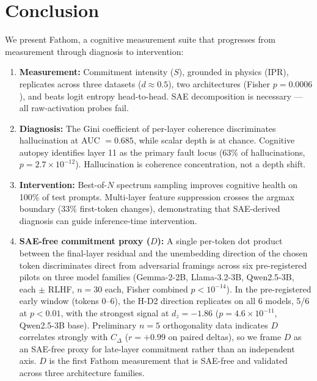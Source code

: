 \documentclass{article}
\begin{document}
\section{Conclusion}

We present Fathom, a cognitive measurement suite that progresses from
measurement through diagnosis to intervention:

\begin{enumerate}
\item \textbf{Measurement:} Commitment intensity ($S$), grounded in
  physics (IPR), replicates across three datasets ($d \approx 0.5$),
  two architectures (Fisher $p = 0.0006$), and beats logit entropy
  head-to-head. SAE decomposition is necessary --- all raw-activation
  probes fail.
\item \textbf{Diagnosis:} The Gini coefficient of per-layer coherence
  discriminates hallucination at AUC $= 0.685$, while scalar depth is
  at chance. Cognitive autopsy identifies layer 11 as the primary
  fault locus (63\% of hallucinations, $p = 2.7 \times 10^{-12}$).
  Hallucination is coherence concentration, not a depth shift.
\item \textbf{Intervention:} Best-of-$N$ spectrum sampling improves
  cognitive health on 100\% of test prompts. Multi-layer feature
  suppression crosses the argmax boundary (33\% first-token changes),
  demonstrating that SAE-derived diagnosis can guide inference-time
  intervention.
\item \textbf{SAE-free commitment proxy ($D$):} A single per-token
  dot product between the final-layer residual and the unembedding
  direction of the chosen token discriminates direct from
  adversarial framings across six pre-registered pilots on three
  model families (Gemma-2-2B, Llama-3.2-3B, Qwen2.5-3B, each
  $\pm$ RLHF, $n=30$ each, Fisher combined $p < 10^{-14}$). In
  the pre-registered early window (tokens 0--6), the H-D2 direction
  replicates on all 6 models, 5/6 at $p < 0.01$, with the strongest
  signal at $d_z = -1.86$ ($p = 4.6\!\times\!10^{-11}$, Qwen2.5-3B
  base). Preliminary $n=5$ orthogonality data indicates $D$
  correlates strongly with $C_\Delta$ ($r = +0.99$ on paired
  deltas), so we frame $D$ as an SAE-free proxy for late-layer
  commitment rather than an independent axis. $D$ is the first
  Fathom measurement that is SAE-free and validated across three
  architecture families.
\end{enumerate}
\end{document}
